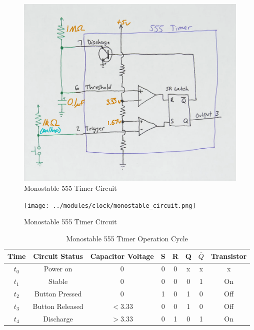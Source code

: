 \documentclass[12pt]{article}
\begin{document}
\begin{FlushLeft}
\begin{figure}[h]
  \begin{center}
    \includegraphics[width=0.8\linewidth]{../modules/clock/monostable_circuit_diagram.png}
    \caption{Monostable 555 Timer Circuit}
    \label{fig:monostable_circuit_diagram}
  \end{center}
\end{figure}

\begin{figure}[h]
  \begin{center}
    \texttt{[image: ../modules/clock/monostable\_circuit.png]}
    \caption{Monostable 555 Timer Circuit}
    \label{fig:monostable_circuit}
  \end{center}
\end{figure}

\begin{table}[ht]
  \begin{center}
    \begin{tabular}{ c | c c c c c c c }
      Time & Circuit Status & Capacitor Voltage & S & R & Q & $\overline Q$ & Transistor \\
      \hline
      $t_0$ & Power on        & 0       & 0 & 0 & x & x & x    \\
      $t_1$ & Stable          & 0       & 0 & 0 & 0 & 1 & On   \\
      $t_2$ & Button Pressed  & 0       & 1 & 0 & 1 & 0 & Off  \\
      $t_3$ & Button Released & $<3.33$ & 0 & 0 & 1 & 0 & Off  \\
      $t_4$ & Discharge       & $>3.33$ & 0 & 1 & 0 & 1 & On   \\
    \end{tabular}
    \caption{Monostable 555 Timer Operation Cycle}
    \label{tab:monostable_cycle}
  \end{center}
\end{table}


\end{FlushLeft}
\end{document}
